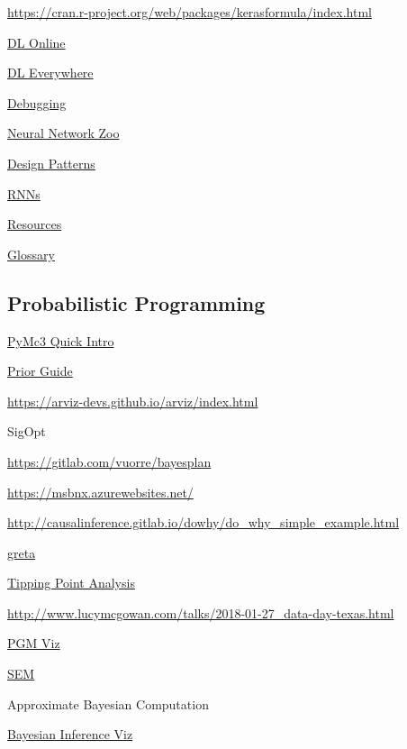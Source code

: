 \documentclass[]{book}
\begin{document}
\url{https://cran.r-project.org/web/packages/kerasformula/index.html}

\href{https://tenso.rs}{DL Online}

\href{http://vertex.ai/}{DL Everywhere}

\href{http://theorangeduck.com/page/neural-network-not-working}{Debugging}

\href{http://www.asimovinstitute.org/neural-network-zoo/}{Neural Network
Zoo}

\href{http://www.deeplearningpatterns.com/doku.php/applications}{Design
Patterns}

\href{http://github.stfi.re/kjw0612/awesome-rnn?sf=dlpbez\#aa}{RNNs}

\href{https://yanirseroussi.com/deep-learning-resources/}{Resources}

\href{http://www.wildml.com/deep-learning-glossary/}{Glossary}

\subsection{Probabilistic
Programming}\label{probabilistic-programming-1}

\href{https://docs.google.com/presentation/d/1buknIrG5b8u0twrwvlxcTudIOdx68AlqDiST_A_jJ9g/edit\#slide=id.g4254d546f6_0_0}{PyMc3
Quick Intro}

\href{https://github.com/stan-dev/stan/wiki/Prior-Choice-Recommendations}{Prior
Guide}

\url{https://arviz-devs.github.io/arviz/index.html}

SigOpt

\url{https://gitlab.com/vuorre/bayesplan}

\url{https://msbnx.azurewebsites.net/}

\url{http://causalinference.gitlab.io/dowhy/do_why_simple_example.html}

\href{https://rviews.rstudio.com/2018/04/23/on-first-meeting-greta/}{greta}

\href{https://cran.r-project.org/web/packages/tipr/index.html}{Tipping
Point Analysis}

\url{http://www.lucymcgowan.com/talks/2018-01-27_data-day-texas.html}

\href{http://daft-pgm.org}{PGM Viz}

\href{http://sachaepskamp.com/SEM2017}{SEM}

Approximate Bayesian Computation

\href{http://rpsychologist.com/d3/bayes/}{Bayesian Inference Viz}
\end{document}
